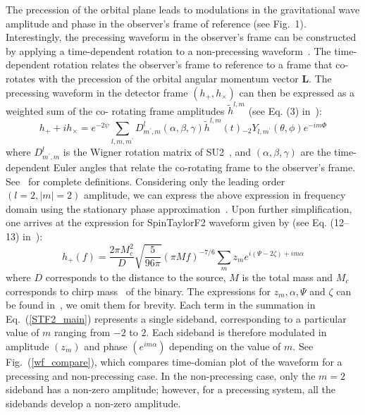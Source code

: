 The precession of the orbital plane leads to modulations in the gravitational
wave amplitude and phase in the observer's frame of reference (see Fig.~1).
Interestingly, the precessing waveform in the observer's frame can be constructed  by
applying a time-dependent rotation to a non-precessing
waveform~\cite{Boyle2011}. The time-dependent rotation relates the observer's
frame to  reference to a frame that co-rotates with the precession of the
orbital angular momentum vector $\mathbf{L}$. The precessing waveform in the detector
frame $(h_{+},h_{\times})$ can then be expressed as a weighted sum of the co-
rotating frame amplitudes $\tilde{h}^{l,m}$ (see Eq. (3)
in~\cite{Lundgren2014}): 
\begin{equation}  
h_{+} + i h_{\times} = e^{-2 \psi}
\sum_{l,m,m^{\prime}} D^{l}_{m^{\prime},m} \left(\alpha, \beta, \gamma\right)
\tilde{h}^{l,m}(t){}_{-2}Y_{l,m^{\prime}}\left(\theta,\phi\right)e^{-i m \Phi}
\end{equation}  
where $D^{l}_{m^{\prime},m}$ is the Wigner rotation matrix of
SU2~\cite{Boyle2011}, and $\left(\alpha, \beta, \gamma\right)$ are the time-
dependent  Euler angles that relate the co-rotating frame to the observer's
frame. See~\cite{Lundgren2014} for complete definitions. 
Considering only the leading order $(l=2, |m| = 2)$ amplitude, 
we can express the above expression in frequency domain
using the stationary phase approximation~\cite{Lundgren2014}. Upon further simplification,
one arrives at the expression for SpinTaylorF2 waveform given by (see Eq. (12--13)
in~\cite{Lundgren2014}):
\begin{equation} 
\label{STF2_main}
h_{+}(f) = \dfrac{2\pi M_{c}^{2}}{D}\sqrt{\dfrac{5}{96\pi}}(\pi M f)^{-7/6}\sum_{m}z_{m}e^{i(\Psi - 2\zeta) + i m \alpha}
\end{equation}
where $D$ corresponds to the distance to the source, $M$ is the total mass and $M_{c}$ 
corresponds to chirp mass~\cite{Lundgren2014} of the binary. The expressions for $z_{m}, \alpha, \Psi$ and $\zeta$ 
can be found in~\cite{Lundgren2014}, we omit them for brevity. Each term in the summation in Eq.~(\ref{STF2_main}) 
represents a single sideband, corresponding to a particular value of $m$ ranging from $-2$ to $2$. Each sideband is 
therefore modulated in amplitude $(z_{m})$ and phase $(e^{i m \alpha})$ depending on the value of $m$. See Fig.~(\ref{wf_compare}), which 
compares time-domian plot of the waveform for a precessing and non-precessing case. In the non-precessing case, 
only the $m=2$ sideband has a non-zero amplitude; however, for a precessing system, all the sidebands
develop a non-zero amplitude. 

